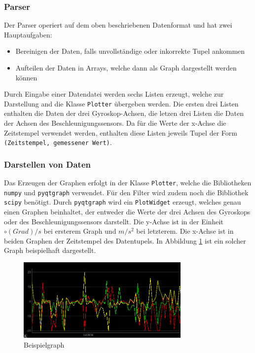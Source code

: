 \subsubsection{Parser}
Der Parser operiert auf dem oben beschriebenen Datenformat und hat zwei Hauptaufgaben:
\begin{itemize}
 \item Bereinigen der Daten, falls unvollständige oder inkorrekte Tupel ankommen
 \item Aufteilen der Daten in Arrays, welche dann als Graph dargestellt werden können
\end{itemize}
Durch Eingabe einer Datendatei werden sechs Listen erzeugt, welche zur Darstellung and die Klasse \texttt{Plotter} übergeben werden. Die ersten drei Listen enthalten die Daten der drei Gyroskop-Achsen, die letzen drei Listen die Daten der Achsen des Beschleunigungssensors. Da für die Werte der x-Achse die Zeitstempel verwendet werden, enthalten diese Listen jeweils Tupel der Form \texttt{(Zeitstempel, gemessener Wert)}.
\subsubsection{Darstellen von Daten}
Das Erzeugen der Graphen erfolgt in der Klasse \texttt{Plotter}, welche die Bibliotheken \texttt{numpy} und \texttt{pyqtgraph} verwendet. Für den Filter wird zudem noch die Bibliothek \texttt{scipy} benötigt. Durch \texttt{pyqtgraph} wird ein \texttt{PlotWidget} erzeugt, welches genau einen Graphen beinhaltet, der entweder die Werte der drei Achsen des Gyroskops oder des Beschleunigungssensors darstellt. Die y-Achse ist in der Einheit $\circ(Grad)/s$ bei ersterem Graph und $m/s^{2}$ bei letzterem. Die x-Achse ist in beiden Graphen der Zeitstempel des Datentupels. In Abbildung \ref{fig:k3_4-graph.png} ist ein solcher Graph beispielhaft dargestellt.
\begin{figure}[h]
	\centering
	\includegraphics[width=0.75\textwidth]{images/k3-graph.png}
	\caption {Beispielgraph}
	\label{fig:k3_4-graph.png} 
\end{figure}

